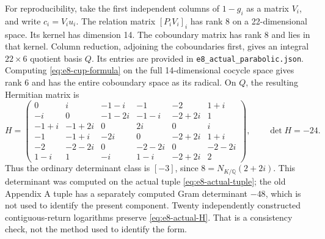 For reproducibility, take the first independent columns of \(1-g_i\)
as a matrix \(V_i\), and write \(c_i=V_iu_i\). The relation matrix
\([P_iV_i]_i\) has rank 8 on a 22-dimensional space. Its kernel has
dimension 14. The coboundary matrix has rank 8 and lies in that kernel.
Column reduction, adjoining the coboundaries first, gives an integral
\(22\times6\) quotient basis \(Q\). Its entries are provided in
\texttt{e8\_actual\_parabolic.json}. Computing
\eqref{eq:e8-cup-formula} on the full 14-dimensional cocycle space
gives rank 6 and has the entire coboundary space as its radical.
On \(Q\), the resulting Hermitian matrix is
\begin{equation}\label{eq:e8-actual-H}
 H=\begin{pmatrix}
0&i&-1-i&-1&-2&1+i\\
-i&0&-1-2i&-1-i&-2+2i&1\\
-1+i&-1+2i&0&2i&0&i\\
-1&-1+i&-2i&0&-2+2i&1+i\\
-2&-2-2i&0&-2-2i&0&-2-2i\\
1-i&1&-i&1-i&-2+2i&2
\end{pmatrix},\qquad \det H=-24.
\end{equation}
Thus the ordinary determinant class is \([-3]\), since
\(8=N_{K/\mathbb Q}(2+2i)\). This determinant was computed on the
actual tuple \eqref{eq:e8-actual-tuple}; the old Appendix A tuple has
a separately computed Gram determinant \(-48\), which is not used
to identify the present component. Twenty independently constructed
contiguous-return logarithms preserve \eqref{eq:e8-actual-H}.
That is a consistency check, not the method used to identify the form.

